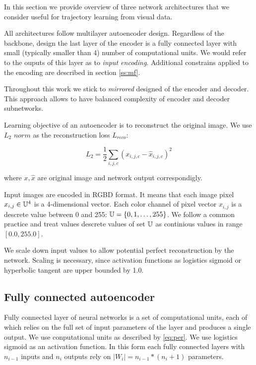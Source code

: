 In this section we provide overview of three network architectures that we consider useful for trajectory learning from visual data.

All architectures follow multilayer autoencoder design.
Regardless of the backbone, design the last layer of the encoder is a fully connected layer with small (typically smaller than 4) number of computational units.
We would refer to the ouputs of this layer as to  \textit{input encoding}.
Additional constrains applied to the encoding are described in section \ref{ss:mf}.

Throughout this work we stick to \textit{mirrored} designed of the encoder and decoder.
This approach allows to have balanced complexity of encoder and decoder subnetworks.

Learning objective of an autoencoder is to reconstruct the original image.
We use $L_2$ $norm$ as the reconstruction loss $L_{reco}$:

\begin{equation}
  L_{2} = \frac{1}{2} \sum_{i, j, c} (x_{i,j,c} - \hat{x}_{i,j,c})^2
\end{equation}

where $x, \hat{x}$ are original image and network output correspondigly.

Input images are encoded in RGBD format. It means that each image pixel $x_{i,j} \in \Bbb{U}^4$ is a 4-dimensional vector.
Each color channel of pixel vector $x_{i,j}$ is a descrete value between 0 and 255: $\Bbb{U} = \{0, 1, \ldots, 255 \}$.
We follow a common practice and treat values descrete values of set $\Bbb{U}$ as continious values in range $[0.0, 255.0]$.

We scale down input values to allow potential perfect reconstruction by the network.
Scaling is necessary, since activation functions as logistics sigmoid or hyperbolic tangent are upper bounded by 1.0.


\subsection{Fully connected autoencoder}

Fully connected layer of neural networks is a set of computational units, each of which relies on the full set of input parameters of the layer and produces a single output.
We use conputational units as described by \ref{eq:per}. We use logistics sigmoid as an activation function.
In this form each fully connected layers with $n_{i-1}$ inputs and $n_i$ outputs rely on $|W_i|=n_{i-1}*(n_i+1)$ parameters.

